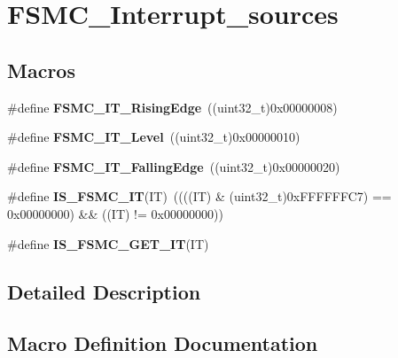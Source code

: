\hypertarget{group___f_s_m_c___interrupt__sources}{}\section{F\+S\+M\+C\+\_\+\+Interrupt\+\_\+sources}
\label{group___f_s_m_c___interrupt__sources}
\subsection*{Macros}
\begin{DoxyCompactItemize}
\item 
\hypertarget{group___f_s_m_c___interrupt__sources_gac483854bd6f90d8c7899a597a0c0ab1a}{}\#define {\bfseries F\+S\+M\+C\+\_\+\+I\+T\+\_\+\+Rising\+Edge}~((uint32\+\_\+t)0x00000008)\label{group___f_s_m_c___interrupt__sources_gac483854bd6f90d8c7899a597a0c0ab1a}

\item 
\hypertarget{group___f_s_m_c___interrupt__sources_ga59b5839854074008fb36fa86ec50a0c7}{}\#define {\bfseries F\+S\+M\+C\+\_\+\+I\+T\+\_\+\+Level}~((uint32\+\_\+t)0x00000010)\label{group___f_s_m_c___interrupt__sources_ga59b5839854074008fb36fa86ec50a0c7}

\item 
\hypertarget{group___f_s_m_c___interrupt__sources_ga8e4b9589c9981c900b5f2e84581a9693}{}\#define {\bfseries F\+S\+M\+C\+\_\+\+I\+T\+\_\+\+Falling\+Edge}~((uint32\+\_\+t)0x00000020)\label{group___f_s_m_c___interrupt__sources_ga8e4b9589c9981c900b5f2e84581a9693}

\item 
\hypertarget{group___f_s_m_c___interrupt__sources_ga40a38f097a75f27a700e626905fa9a38}{}\#define {\bfseries I\+S\+\_\+\+F\+S\+M\+C\+\_\+\+I\+T}(I\+T)~((((I\+T) \& (uint32\+\_\+t)0x\+F\+F\+F\+F\+F\+F\+C7) == 0x00000000) \&\& ((\+I\+T) != 0x00000000))\label{group___f_s_m_c___interrupt__sources_ga40a38f097a75f27a700e626905fa9a38}

\item 
\#define {\bfseries I\+S\+\_\+\+F\+S\+M\+C\+\_\+\+G\+E\+T\+\_\+\+I\+T}(I\+T)
\end{DoxyCompactItemize}


\subsection{Detailed Description}


\subsection{Macro Definition Documentation}
\hypertarget{group___f_s_m_c___interrupt__sources_gae2a57d0b15e025212489ec1421ff245d}{}
